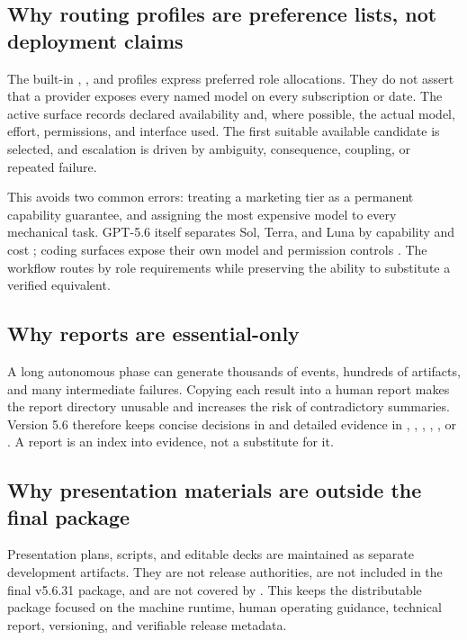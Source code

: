 \documentclass[11pt,a4paper]{article}
\newcommand{\code}[1]{\texttt{\detokenize{#1}}}
\begin{document}
\subsection{Why routing profiles are preference lists, not deployment claims}

The built-in \code{all}, \code{chatgpt_only}, and \code{claude_only} profiles express preferred role allocations. They do not assert that a provider exposes every named model on every subscription or date. The active surface records declared availability and, where possible, the actual model, effort, permissions, and interface used. The first suitable available candidate is selected, and escalation is driven by ambiguity, consequence, coupling, or repeated failure.

This avoids two common errors: treating a marketing tier as a permanent capability guarantee, and assigning the most expensive model to every mechanical task. GPT-5.6 itself separates Sol, Terra, and Luna by capability and cost \cite{openai56release2026}; coding surfaces expose their own model and permission controls \cite{anthropicclaudecodecli2025,githubcopilotcli2026}. The workflow routes by role requirements while preserving the ability to substitute a verified equivalent.

\subsection{Why reports are essential-only}

A long autonomous phase can generate thousands of events, hundreds of artifacts, and many intermediate failures. Copying each result into a human report makes the report directory unusable and increases the risk of contradictory summaries. Version 5.6 therefore keeps concise decisions in  and detailed evidence in , , , , , or . A report is an index into evidence, not a substitute for it.


\subsection{Why presentation materials are outside the final package}

Presentation plans, scripts, and editable decks are maintained as separate development artifacts.
They are not release authorities, are not included in the final v5.6.31 package, and are not covered
by . This keeps the distributable package focused on the machine runtime,
human operating guidance, technical report, versioning, and verifiable release metadata.
\end{document}
